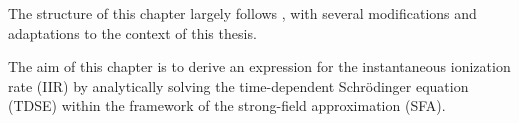 


The structure of this chapter largely follows \cite{Ivanov20012005}, with several modifications and adaptations to the context of this thesis.

The aim of this chapter is to derive an expression for the instantaneous ionization rate (IIR) by analytically solving the time-dependent Schrödinger equation (TDSE) within the framework of the strong-field approximation (SFA).




